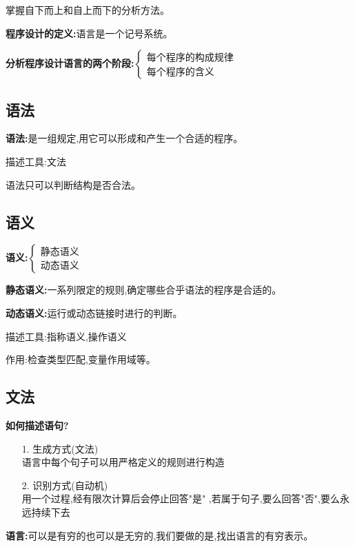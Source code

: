   掌握自下而上和自上而下的分析方法。

  \spaceline
  \textbf{程序设计的定义:}语言是一个记号系统。

  \textbf{分析程序设计语言的两个阶段:}$\left \{\begin{array}{l} \text{每个程序的构成规律}\\\text{每个程序的含义}\end{array} \right .$

    \subsection{语法}
    \textbf{语法:}是一组规定,用它可以形成和产生一个合适的程序。

    描述工具:文法

    语法只可以判断结构是否合法。

    \subsection{语义}
    \textbf{语义:}$\left \{ \begin{array}{l}\text{静态语义}\\\text{动态语义} \end{array} \right.$

    \spaceline

    \textbf{静态语义:}一系列限定的规则,确定哪些合乎语法的程序是合适的。

    \textbf{动态语义:}运行或动态链接时进行的判断。

    描述工具:指称语义,操作语义

    作用:检查类型匹配,变量作用域等。

    \subsection{文法}
    \textbf{如何描述语句?}
    \begin{itemize}
      \item [1.] 生成方式(文法)\\
      语言中每个句子可以用严格定义的规则进行构造
      \item [2.] 识别方式(自动机)\\
      用一个过程,经有限次计算后会停止回答"是" ,若属于句子,要么回答"否",要么永远持续下去
    \end{itemize}

    \spaceline
    \textbf{语言:}可以是有穷的也可以是无穷的,我们要做的是,找出语言的有穷表示。

